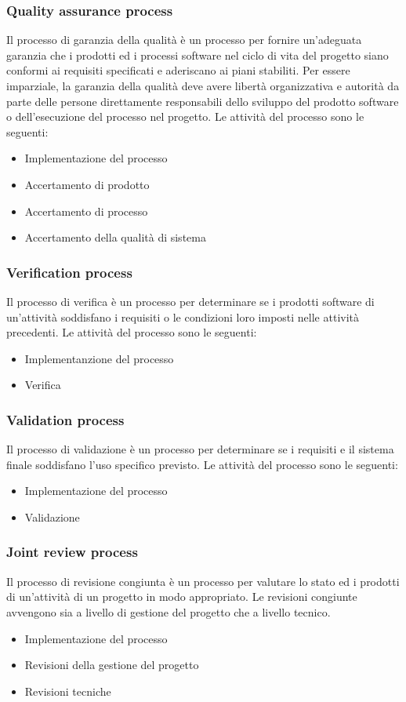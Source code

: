 \subsubsection{Quality assurance process}
Il processo di garanzia della qualità è un processo per fornire un'adeguata garanzia che i prodotti ed i processi software nel ciclo di vita del progetto siano conformi ai requisiti specificati e aderiscano ai piani stabiliti. Per essere imparziale, la garanzia della qualità deve avere libertà organizzativa e autorità da parte delle persone direttamente responsabili dello sviluppo del prodotto software o dell'esecuzione del processo nel progetto.
Le attività del processo sono le seguenti:
\begin{itemize}
\item Implementazione del processo
\item Accertamento di prodotto
\item Accertamento di processo
\item Accertamento della qualità di sistema
\end{itemize}
\subsubsection{Verification process}
Il processo di verifica è un processo per determinare se i prodotti software di un'attività soddisfano i requisiti o le condizioni loro imposti nelle attività precedenti.
Le attività del processo sono le seguenti:
\begin{itemize}
\item Implementanzione del processo
\item Verifica
\end{itemize}
\subsubsection{Validation process}
Il processo di validazione è un processo per determinare se i requisiti e il sistema finale soddisfano l'uso specifico previsto.
Le attività del processo sono le seguenti:
\begin{itemize}
\item Implementazione del processo
\item Validazione
\end{itemize}

\subsubsection{Joint review process}
Il processo di revisione congiunta è un processo per valutare lo stato ed i prodotti di un'attività di un progetto in modo appropriato. Le revisioni congiunte avvengono sia a livello di gestione del progetto che a livello tecnico.
\begin{itemize}
\item Implementazione del processo
\item Revisioni della gestione del progetto
\item Revisioni tecniche
\end{itemize}

